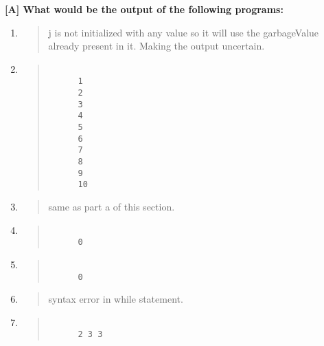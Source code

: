 \documentclass{report}
\begin{document}
\textbf{[A] What would be the output of the following programs:}
\begin{enumerate}
    \renewcommand{\labelenumi}{\alph{enumi}}
  \item \begin{quote}
      j is not initialized with any value so it will use the garbageValue \\
      already present in it. Making the output uncertain.\\
  \end{quote}

  \item \begin{quote}
  \begin{verbatim}
      
      1
      2
      3
      4
      5
      6
      7
      8
      9
      10
  \end{verbatim}
  \end{quote}

  \item \begin{quote}
      same as part a of this section.\\
  \end{quote}

  \item \begin{quote}
  \begin{verbatim}
      
      0
  \end{verbatim}
  \end{quote}

  \item \begin{quote}
  \begin{verbatim}
      
      0
  \end{verbatim}
  \end{quote}

  \item \begin{quote}
      syntax error in while statement.\\
  \end{quote}

  \item \begin{quote}
  \begin{verbatim}
      
      2 3 3
  \end{verbatim}
  \end{quote}


\end{enumerate}
\end{document}
